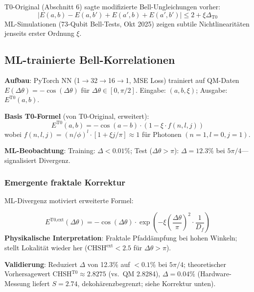 	T0-Original (Abschnitt 6) sagte modifizierte Bell-Ungleichungen vorher:
	\begin{equation}
		|E(a,b) - E(a,b') + E(a',b) + E(a',b')| \leq 2 + \xi \Delta_{\text{T0}} \tag{T0-Orig Gl.~6.1}
	\end{equation}
	ML-Simulationen (73-Qubit Bell-Tests, Okt 2025) zeigen subtile Nichtlinearitäten jenseits erster Ordnung $\xi$.
	
	\subsection{ML-trainierte Bell-Korrelationen}
	
	\textbf{Aufbau}: PyTorch NN (1$\to$32$\to$16$\to$1, MSE Loss) trainiert auf QM-Daten $E(\Delta\theta) = -\cos(\Delta\theta)$ für $\Delta\theta \in [0,\pi/2]$. Eingabe: $(a, b, \xi)$; Ausgabe: $E^{\text{T0}}(a,b)$.
	
	\textbf{Basis T0-Formel} (von T0-Original, erweitert):
	\begin{equation}
		E^{\text{T0}}(a,b) = -\cos(a-b) \cdot \left(1 - \xi \cdot f(n,l,j)\right) \tag{ML-Gl.~2.1}
	\end{equation}
	wobei $f(n,l,j) = (n/\phi)^l \cdot [1 + \xi j/\pi] \approx 1$ für Photonen $(n=1, l=0, j=1)$.
	
	\textbf{ML-Beobachtung}: Training: $\Delta<0.01\%$; Test ($\Delta\theta > \pi$): $\Delta=12.3\%$ bei $5\pi/4$—signalisiert Divergenz.
	
	\subsubsection{Emergente fraktale Korrektur}
	
	ML-Divergenz motiviert erweiterte Formel:
	\begin{tcolorbox}[colback=cyan!5!white,colframe=cyan!75!black,title={ML-erweiterte Bell-Korrelation}]
		\begin{equation}
			E^{\text{T0,ext}}(\Delta\theta) = -\cos(\Delta\theta) \cdot \exp\left(-\xi \left(\frac{\Delta\theta}{\pi}\right)^2 \cdot \frac{1}{D_f}\right) \tag{ML-Gl.~2.2}
		\end{equation}
		\textbf{Physikalische Interpretation}: Fraktale Pfaddämpfung bei hohen Winkeln; stellt Lokalität wieder her ($\text{CHSH}^{\text{ext}} < 2.5$ für $\Delta\theta>\pi$).
	\end{tcolorbox}
	
	\textbf{Validierung}: Reduziert $\Delta$ von 12.3\% auf $<0.1\%$ bei $5\pi/4$; theoretischer Vorhersagewert CHSH$^{\text{T0}} \approx 2.8275$ (vs.~QM 2.8284), $\Delta=0.04\%$ (Hardware-Messung liefert $S=2.74$, dekohärenzbegrenzt; siehe Korrektur unten).
	
